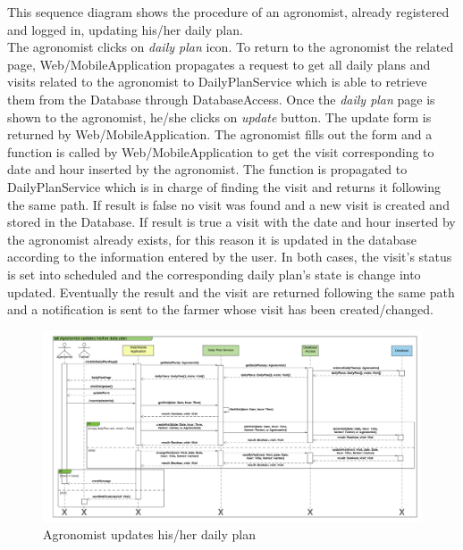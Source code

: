 This sequence diagram shows the procedure of an agronomist, already registered and logged in, updating his/her daily plan.\\
The agronomist clicks on \textit{daily plan} icon. To return to the agronomist the related page, Web/MobileApplication propagates a request to get all daily plans and visits related to the agronomist to DailyPlanService which is able to retrieve them from the Database through DatabaseAccess. 
Once the \textit{daily plan} page is shown to the agronomist, he/she clicks on \textit{update} button. The update form is returned by Web/MobileApplication. The agronomist fills out the form and a function is called by Web/MobileApplication to get the visit corresponding to date and hour inserted by the agronomist. The function is propagated to DailyPlanService which is in charge of finding the visit and returns it following the same path. If result is false no visit was found and a new visit is created and stored in the Database. If result is true a visit with the date and hour inserted by the agronomist already exists, for this reason it is updated in the database according to the information entered by the user. In both cases, the visit's status is set into scheduled and the corresponding daily plan's state is change into updated. 
Eventually the result and the visit are returned following the same path and a notification is sent to the farmer whose visit has been created/changed.

\newpage
\begin{landscape}
\begin{figure}[h]
\vspace*{-2cm}
\noindent
\centering
\centerline{\includegraphics[scale= 0.108]{./Images/Sequence diagram/Agronomist updates his_her daily plan.png}}
    \caption{Agronomist updates his/her daily plan}
    \vspace*{-12cm}
\end{figure}
\fillandplacepagenumber
\end{landscape}


